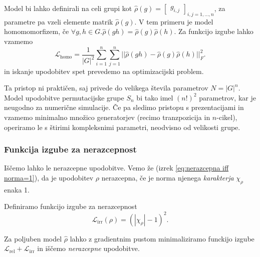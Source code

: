 \documentclass[mat2, tisk]{fmfdelo}
\newcommand{\Loss}[1]{\mathcal L _\text{#1}}
\begin{document}
      \begin{opomba}
        Model bi lahko definirali na celi grupi kot $\hat\rho(g)=
        \begin{bmatrix}
          g_{i,j}
        \end{bmatrix}_{i,j=1,\dotsc, n}$, za parametre pa vzeli
        elemente matrik $\hat\rho(g)$. V tem primeru je model
        homomomorfizem, če $\forall g, h \in G.
        \hat\rho(gh)=\hat\rho(g) \hat\rho(h)$. Za funkcijo izgube lahko vzamemo
        $$
        \Loss{homo} = \frac{1}{|G|^2}\sum_{i=1}^n \sum_{j=1}^n ||
        \hat\rho(gh)-\hat\rho(g) \hat\rho(h)||_F^2.
        $$
        in iskanje upodobitev spet prevedemo na optimizacijski problem.

        Ta pristop ni praktičen, saj privede do velikega števila
        parametrov $N=|G|^n$. Model upodobitve permutacijske grupe
        $S_n$ bi tako imel $(n!)^2$ parametrov, kar je neugodno za
        numerične simulacije. Če pa sledimo pristopu s prezentacijami
        in vzamemo minimalno množico generatorjev (recimo
        tranzpozicija in $n$-cikel), operiramo le s štirimi
        kompleksnimi parametri, neodvisno od velikosti grupe.
      \end{opomba}
      \subsubsection{Funkcija izgube za nerazcepnost}
      Iščemo lahko le nerazcepne upodobitve. Vemo že (izrek
      \ref{eq:nerazcepna iff norma=1}), da je upodobitev $\rho$
      nerazcepna, če je norma njenega \emph{karakterja} $\chi_\rho$ enaka 1.

      \begin{definicija}
        Definiramo funkcijo izgube za nerazcepnost
        \begin{equation}
          \label{eq:irr loss}
          \Loss{irr}(\rho) = (|\chi_\rho| - 1)^2.
        \end{equation}
      \end{definicija}
      Za poljuben model $\hat \rho$ lahko z gradientnim pustom
      minimaliziramo funckijo izgube $\Loss{rel} + \Loss{irr}$ in
      iščemo \emph{nerazcepne} upodobitve.
\end{document}
